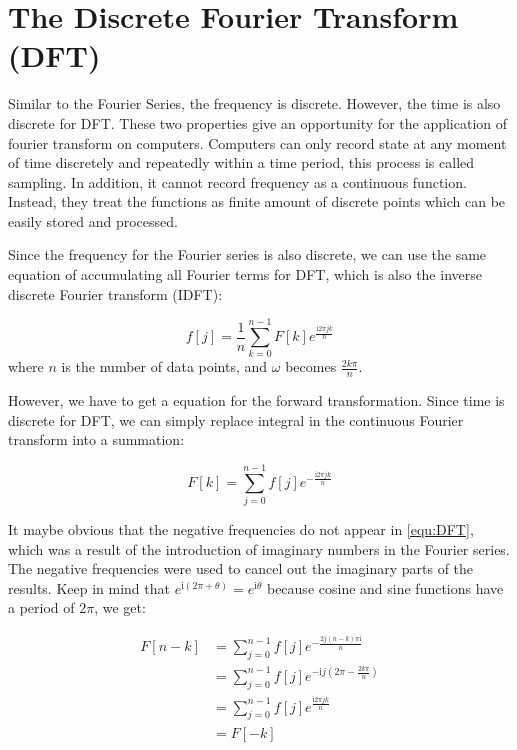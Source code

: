 \section{The Discrete Fourier Transform (DFT)}
Similar to the Fourier Series, the frequency is discrete. 
However, the time is also discrete for DFT. 
These two properties give an opportunity for the application of fourier transform on computers. 
Computers can only record state at any moment of time discretely and repeatedly within a time period, 
this process is called sampling. In addition, it cannot record frequency as a continuous function. 
Instead, they treat the functions as finite amount of discrete points which can be easily stored and processed.

Since the frequency for the Fourier series is also discrete, 
we can use the same equation of accumulating all Fourier terms for DFT, 
which is also the inverse discrete Fourier transform (IDFT):

\begin{equation}
    f[j] = \frac{1}{n} \sum_{k=0}^{n-1} F[k] e^{\frac{\mathrm{i}2\pi jk}{n}} 
    \label{equ:IDFT}
\end{equation}
where $n$ is the number of data points, and $\omega$ becomes $\frac{2k\pi}{n}$. 


However, we have to get a equation for the forward transformation. 
Since time is discrete for DFT, 
we can simply replace integral in the continuous Fourier transform into a summation:

\begin{equation}
    F[k] = \sum_{j=0}^{n-1} f[j] e^{-\frac{\mathrm{i}2\pi jk}{n}} 
    \label{equ:DFT}
\end{equation}

It maybe obvious that the negative frequencies do not appear in \eqref{equ:DFT}, 
which was a result of the introduction of imaginary numbers in the Fourier series. 
The negative frequencies were used to cancel out the imaginary parts of the results. 
Keep in mind that $e^{\mathrm{i}(2\pi+\theta)} = e^{\mathrm{i}\theta}$ 
because cosine and sine functions have a period of $2\pi$, we get:

$$\begin{aligned}
    F[n-k] 
    &= \sum_{j=0}^{n-1} f[j] e^{-\frac{2j(n-k)\pi\mathrm{i}}{n}} \\ 
    &= \sum_{j=0}^{n-1} f[j] e^{-\mathrm{i}j(2\pi - \frac{2k\pi}{n})} \\ 
    &= \sum_{j=0}^{n-1} f[j] e^{\frac{\mathrm{i}2\pi jk} {n}}   \\
    &= F[-k] 
\end{aligned}$$

